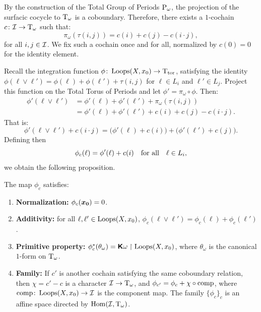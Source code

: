 \documentclass[11pt,reqno,letterpaper,twoside]{amsart}
\begin{document}
  \begin{article}
    \label{art:The Rectified Integration on Based Loops}
    
    By the construction of the Total Group of Periods $\operatorname{P}_\omega$,
    the projection of the surfacic cocycle to $\mathrm{T}_\omega$ is a coboundary.
    Therefore,
    there exists a $1$-cochain $c \colon \mathcal{I} \to \mathrm{T}_\omega$ such that:
    \[
      \pi_\omega(\tau(i,j)) = c(i) + c(j) - c(i \cdot j),
      \]
    for all $i, j \in \mathcal{I}$.
    We fix such a cochain once and for all,
    normalized by $c(0) = 0$ for the identity element.
    
    Recall the integration function $\phi \colon \operatorname{Loops}(X, x_0) \to \mathrm{T}_{\mathrm{tor}}$,
    satisfying the identity $\phi(\ell \vee \ell') = \phi(\ell) + \phi(\ell') + \tau(i,j)$ for $\ell \in L_i$ and $\ell' \in L_j$.
    Project this function on the Total Torus of Periods and let $\phi' = \pi_\omega \circ \phi$.
    Then:
    \begin{align*}
      \phi'(\ell \vee \ell')
      &= \phi'(\ell) + \phi'(\ell') + \pi_\omega(\tau(i,j)) \\
      &= \phi'(\ell) + \phi'(\ell') + c(i) + c(j) - c(i \cdot j).
    \end{align*}
    That is:
    \[
      \phi'(\ell \vee \ell') + c(i \cdot j) = \bigl(\phi'(\ell) + c(i)\bigr) + \bigl(\phi'(\ell') + c(j)\bigr).
      \]
    Defining then
    \[
      \phi_c(\ell) = \phi'(\ell) + c(i) \quad\text{for all}\quad \ell \in L_i,
      \]
    we obtain the following proposition.
    
    \begin{proposition}
      The map $\phi_c$ satisfies:
      \begin{enumerate}
        \item \textbf{Normalization:} $\phi_c(\boldsymbol{x_0}) = 0$.
        \item \textbf{Additivity:} for all $\ell, \ell' \in \operatorname{Loops}(X, x_0)$,
        $\phi_c(\ell \vee \ell') = \phi_c(\ell) + \phi_c(\ell')$.
        \item \textbf{Primitive property:} $\phi_c^*(\theta_\omega) = \boldsymbol{\mathsf{K}}\omega \restriction \operatorname{Loops}(X, x_0)$,
        where $\theta_\omega$ is the canonical $1$-form on $\mathrm{T}_\omega$.
        \item \textbf{Family:}
        If $c'$ is another cochain satisfying the same coboundary relation,
        then $\chi = c' - c$ is a character $\mathcal{I} \to \mathrm{T}_\omega$,
        and $\phi_{c'} = \phi_c + \chi \circ \operatorname{comp}$,
        where $\operatorname{comp} \colon \operatorname{Loops}(X, x_0) \to \mathcal{I}$ is the component map.
        The family $\{\phi_c\}_c$ is an affine space directed by $\mathrm{Hom}(\mathcal{I}, \mathrm{T}_\omega)$.
      \end{enumerate}
    \end{proposition}
  \end{article}
  
\end{document}
